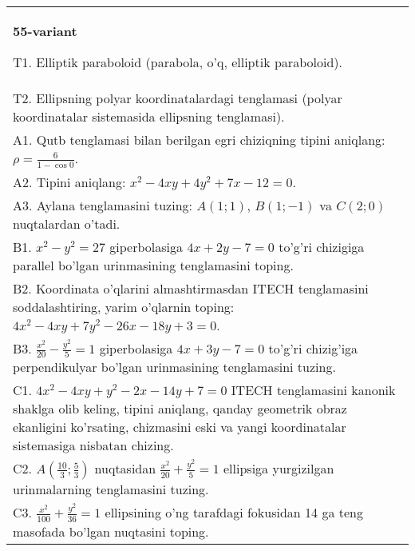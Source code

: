 \documentclass{article}
\begin{document}
\begin{tabular}{m{17cm}}
\textbf{55-variant}
\newline

T1. Elliptik paraboloid (parabola, o'q, elliptik paraboloid).\\

T2. Ellipsning polyar koordinatalardagi tenglamasi (polyar koordinatalar sistemasida ellipsning tenglamasi).\\

A1. Qutb tenglamasi bilan berilgan egri chiziqning tipini aniqlang: $\rho=\frac{6}{1-\cos 0}$.\\

A2. Tipini aniqlang: $x^{2}-4xy+4y^{2}+7x-12=0$.\\

A3. Aylana tenglamasini tuzing: $A(1;1)$, $B(1;-1)$ va $C(2;0)$ nuqtalardan o'tadi.\\

B1. $x^{2} - y^{2} = 27$ giperbolasiga $4x + 2y - 7 = 0$ to'g'ri chizigiga parallel bo'lgan urinmasining tenglamasini toping.  \\

B2. Koordinata o'qlarini almashtirmasdan ITECH tenglamasini soddalashtiring, yarim o'qlarnin toping: $4x^{2} - 4xy + 7y^{2} - 26x - 18y + 3 = 0$.\\

B3. $\frac{x^{2}}{20} - \frac{y^{2}}{5} = 1$ giperbolasiga $4x + 3y - 7 = 0$ to'g'ri chizig'iga perpendikulyar bo'lgan urinmasining tenglamasini tuzing.  \\

C1. $4x^{2} - 4xy + y^{2} - 2x - 14y + 7 = 0$ ITECH tenglamasini kanonik shaklga olib keling, tipini aniqlang, qanday geometrik obraz ekanligini ko'rsating, chizmasini eski va yangi koordinatalar sistemasiga nisbatan chizing.  \\

C2. $A(\frac{10}{3};\frac{5}{3})$ nuqtasidan $\frac{x^{2}}{20} + \frac{y^{2}}{5} = 1$ ellipsiga yurgizilgan urinmalarning tenglamasini tuzing.  \\

C3. $\frac{x^{2}}{100} + \frac{y^{2}}{36} = 1$ ellipsining o'ng tarafdagi fokusidan 14 ga teng masofada bo'lgan nuqtasini toping.  \\

\end{tabular}
\vspace{1cm}
\end{document}
